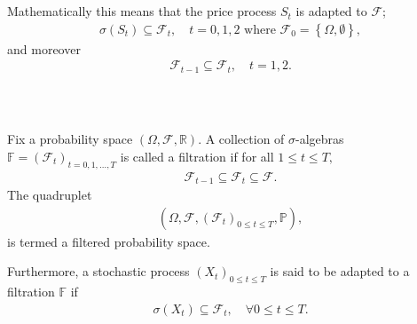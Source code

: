 \documentclass{beamer}
\numberwithin{equation}{section}
\begin{document}
\begin{frame}\frametitle{{\normalsize \secname} \\ {\large \subsecname}}
    Mathematically this means that the price process $S_t$ is adapted to $\mathscr{F}$;
    \begin{align}
        \sigma(S_t) \subseteq \mathscr{F}_t, \quad  t = 0,1,2 \text{ where } \mathscr{F}_0 = \left\{ \Omega, \emptyset \right\},
    \end{align}
    and moreover
    \begin{align}
        \mathscr{F}_{t - 1} \subseteq \mathscr{F}_t, \quad t = 1,2.
    \end{align}
\end{frame}

\begin{frame}\frametitle{{\normalsize \secname} \\ {\large \subsecname}}
    \begin{definition}
        Fix a probability space $(\Omega, \mathscr{F}, \mathbb{R})$.
        A collection of $\sigma$-algebras $\mathbb{F} = \left(\mathscr{F}_t\right)_{t = 0,1,\ldots,T}$ is called a filtration if for all $1 \leq t \leq T,$
        \begin{align}
            \mathscr{F}_{t - 1} \subseteq \mathscr{F}_{t} \subseteq \mathscr{F}.
        \end{align}
        The quadruplet
        \begin{align}
            (\Omega, \mathscr{F}, \left(\mathscr{F}_t\right)_{0 \leq t \leq T}, \mathbb{P}),
        \end{align}
        is termed a filtered probability space.
        
        Furthermore, a stochastic process $(X_t)_{0 \leq t \leq T}$ is said to be adapted to a filtration $\mathbb{F}$ if
        \begin{align}
            \sigma(X_t) \subseteq \mathscr{F}_t, \quad \forall 0 \leq t \leq T.
        \end{align}
    \end{definition}
\end{frame}
\end{document}

